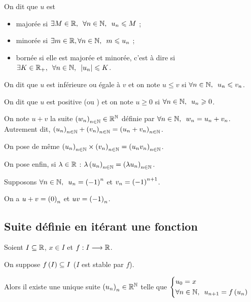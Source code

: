 On dit que \(u\) est \begin{itemize}
\item majorée si \(\quantifs{\exists M\in\R;\forall n\in\N}u_n\leq M\) ;

\item minorée si \(\quantifs{\exists m\in\R,\forall n\in\N}m\leq u_n\) ;

\item bornée si elle est majorée et minorée, c'est à dire si \(\quantifs{\exists K\in\Rp;\forall n\in\N}\abs{u_n}\leq K\).
\end{itemize}

On dit que \(u\) est inférieure ou égale à \(v\) et on note \(u\leq v\) si \(\quantifs{\forall n\in\N}u_n\leq v_n\).

On dit que \(u\) est positive (ou ) et on note \(u\geq0\) si \(\quantifs{\forall n\in\N}u_n\geq0\).

On note \(u+v\) la suite \(\left(w_n\right)_{n\in\mathbb{N}}\in\mathbb{R}^{\mathbb{N}}\) définie par \(\quantifs{\forall n\in\N}w_n=u_n+v_n\). Autrement dit, \(\left(u_n\right)_{n\in\mathbb{N}}+\left(v_n\right)_{n\in\mathbb{N}}=\left(u_n+v_n\right)_{n\in\mathbb{N}}\).

On pose de même \(\left(u_n\right)_{n\in\mathbb{N}}\times\left(v_n\right)_{n\in\mathbb{N}}=\left(u_nv_n\right)_{n\in\mathbb{N}}\).

On pose enfin, si \(\lambda\in\mathbb{R}\) : \(\lambda\left(u_n\right)_{n\in\mathbb{N}}=\left(\lambda u_n\right)_{n\in\mathbb{N}}\).

\begin{ex}
Supposons \(\quantifs{\forall n\in\N}u_n=\paren{-1}^n\) et \(v_n=\left(-1\right)^{n+1}\).

On a \(u+v=\left(0\right)_n\) et \(uv=\left(-1\right)_n\).
\end{ex}

\subsection{Suite définie en itérant une fonction}

\begin{prop}
Soient \(I\subseteq\mathbb{R}\), \(x\in I\) et \(f:I\longrightarrow\mathbb{R}\).

On suppose \(f\left(I\right)\subseteq I\) (\(I\) est stable par \(f\)).

Alors il existe une unique suite \(\left(u_n\right)_n\in\mathbb{R}^{\mathbb{N}}\) telle que \(\begin{dcases}u_0=x \\ \quantifs{\forall n\in\N}u_{n+1}=f\paren{u_n}\end{dcases}\)
\end{prop}

